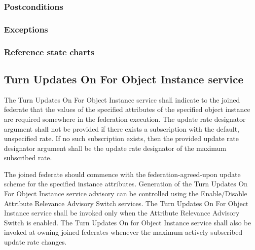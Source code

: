 \begin{compactstdpage}

    \subsubsection{Postconditions}



    \subsubsection{Exceptions}



    \subsubsection{Reference state charts}



    \subsection{Turn Updates On For Object Instance \rtiinitiated{} service}


    The Turn Updates On For Object Instance \rtiinitiated{} service shall indicate to the joined federate that the values of the specified attributes of the specified object instance are required somewhere in the federation execution. The update rate designator argument shall not be provided if there exists a subscription with the default, unspecified rate. If no such subscription exists, then the provided update rate designator argument shall be the update rate designator of the maximum subscribed rate.


    The joined federate should commence with the federation-agreed-upon update scheme for the specified instance attributes. Generation of the Turn Updates On For Object Instance \rtiinitiated{} service advisory can be controlled using the Enable/Disable Attribute Relevance Advisory Switch services. The Turn Updates On For Object Instance \rtiinitiated{} service shall be invoked only when the Attribute Relevance Advisory Switch is enabled. The Turn Updates On for Object Instance \rtiinitiated{} service shall also be invoked at owning joined federates whenever the maximum actively subscribed update rate changes.


\end{compactstdpage}
